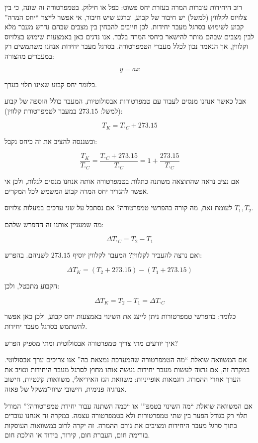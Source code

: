 \documentclass[
  hebrew,
  letterpaper,
  DIV=11,
  numbers=noendperiod]{scrreprt}
\begin{document}
רוב היחידות עוברות המרה בעזרת יחס פשוט: כפל או חילוק. בטמפרטורה זה שונה,
כי בין צלזיוס לקלווין (למשל) יש חיבור של קבוע, וברגע שיש חיבור, אי אפשר
לייצר ``יחס המרה'' קבוע לשימוש בסרגל מעבר יחידות. לכן חייבים להבחין בין
מצבים שבהם נדרש מעבר מלא לבין מצבים שבהם מותר להישאר ביחסי המרה בלבד.
אנו נדגים כאן באמצעות שימוש בצלזיוס וקלווין, אך הנאמר נכון לכלל מעברי
הטמפרטורה. בסרגל מעבר יחידות אנחנו משתמשים רק במעברים מהצורה:

\[
y = ax
\]

כלומר יחס קבוע שאינו תלוי בערך.

אבל כאשר אנחנו מנסים לעבוד עם טמפרטורות אבסולוטיות, המעבר כולל הוספה של
קבוע (למשל: \(273.15\) במעבר לטמפרטורת קלווין):

\[
T_K = T_{^\circ C} + 273.15
\]

וכשננסה להציב את זה כיחס נקבל:

\[
\frac{T_K}{T_{^\circ C}} = \frac{T_{^\circ C} + 273.15}{T_{^\circ C}} = 1 + \frac{273.15}{T_{^\circ C}}
\]

אם נציב נראה שהתוצאה משתנה כתלות בטמפרטורה אותה אנחנו מנסים לגלות, ולכן
אי אפשר להגדיר יחס המרה קבוע המשמש לכל המקרים.

לעומת זאת, מה קורה בהפרשי טמפרטורה? אם נסתכל על שני ערכים במעלות צלזיוס
\(T_1, T_2\).

מה שמעניין אותנו זה ההפרש שלהם:

\[
\Delta T_{^\circ C} = T_2 - T_1
\]

ואם נרצה להעביר לקלווין? המעבר לקלווין יוסיף \(273.15\) לשניהם. בהפרש:

\[
\Delta T_K = (T_2 + 273.15) - (T_1 + 273.15)
\]

הקבוע מתבטל, ולכן:

\[
\Delta T_K = T_2 - T_1 = \Delta T_{^\circ C}
\]

כלומר: בהפרשי טמפרטורות ניתן לייצג את השינוי באמצעות יחס קבוע, ולכן כאן
אפשר להשתמש בסרגל מעבר יחידות.

\begin{tcolorbox}[enhanced jigsaw, colback=white, arc=.35mm, coltitle=black, breakable, toptitle=1mm, leftrule=.75mm, colbacktitle=quarto-callout-tip-color!10!white, opacitybacktitle=0.6, bottomtitle=1mm, titlerule=0mm, opacityback=0, colframe=quarto-callout-tip-color-frame, title=\textcolor{quarto-callout-tip-color}{\faLightbulb}\hspace{0.5em}{עצה}, rightrule=.15mm, bottomrule=.15mm, toprule=.15mm, left=2mm]

איך יודעים מתי צריך טמפרטורה אבסולוטית ומתי מספיק הפרש?

אם המשוואה שואלת ``מה הטמפרטורה שהמערכת נמצאת בה'' אנו צריכים ערך
אבסולוטי. במקרה זה, אם נרצה לעשות מעבר יחידות נעשה אותו מחוץ לסרגל מעבר
היחידות ונציב את הערך אחרי ההמרה. דוגמאות אופייניות: משוואת הגז
האידיאלי, משוואות קינטיות, חישוב אנרגיה פנימית, חישובי שיווי־משקל של
פאזה.

אם המשוואה שואלת ``מה השינוי בטמפ''' או ``כמה השתנה עבור יחידת
טמפרטורה?'' המודל תלוי רק בגודל הפער בין שתי טמפרטורות ולא בטמפרטורה
עצמה. במקרה זה אנחנו עובדים בתוך סרגל מעבר היחידות ומציבים את גורם
ההמרה. זה יקרה לרוב במשוואות העוסקות בזרימת חום, העברת חום, קירור, בידוד
או הולכת חום.

\end{tcolorbox}
\end{document}
